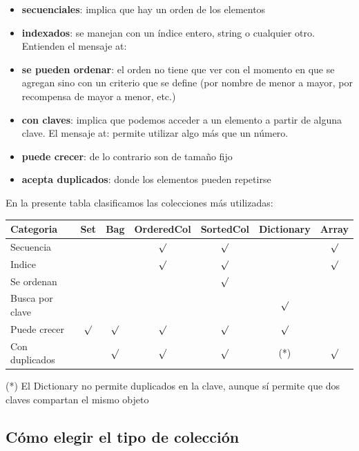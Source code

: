 \documentclass[a4paper,12pt]{book}
\begin{document}
\begin{itemize}
 \item \textbf{secuenciales}: implica que hay un orden de los elementos
 \item \textbf{indexados}: se manejan con un índice entero, string o cualquier otro. Entienden el mensaje at:
 \item \textbf{se pueden ordenar}: el orden no tiene que ver con el momento en que se agregan
 sino con un criterio que se define (por nombre de menor a mayor, por recompensa de mayor a menor, etc.)
 \item \textbf{con claves}: implica que podemos acceder a un elemento a partir de alguna clave. El mensaje
 at: permite utilizar algo más que un número.
 \item \textbf{puede crecer}: de lo contrario son de tamaño fijo
 \item \textbf{acepta duplicados}: donde los elementos pueden repetirse
\end{itemize}

En la presente tabla clasificamos las colecciones más utilizadas:
\newline

\begin{tabular}{|l|c|c|c|c|c|c|}
\hline
\cellcolor[gray]{0.8}
Categoria & \cellcolor[gray]{0.8} Set & \cellcolor[gray]{0.8} Bag & \cellcolor[gray]{0.8} OrderedCol
& \cellcolor[gray]{0.8} SortedCol & \cellcolor[gray]{0.8} Dictionary
& \cellcolor[gray]{0.8} Array \\
\hline
Secuencia & & & $\surd$ & $\surd$ & & $\surd$ \\
\hline
Indice & & & $\surd$ & $\surd$ & & $\surd$ \\
\hline
Se ordenan & & & & $\surd$ & & \\
\hline
Busca por clave & & & & & $\surd$ & \\
\hline
Puede crecer & $\surd$ & $\surd$ & $\surd$ & $\surd$ & $\surd$ & \\
\hline
Con duplicados & & $\surd$ & $\surd$ & $\surd$ & (*) & $\surd$ \\
\hline
\end{tabular}
\newline\newline

(*) El Dictionary no permite duplicados en la clave, aunque sí permite que dos claves compartan el mismo objeto

\subsection{Cómo elegir el tipo de colección}
\end{document}
